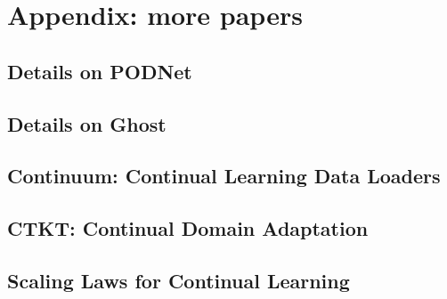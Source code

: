 \chapter{Appendix: more papers}
\label{chapter:appendix}

{}


\section{Details on PODNet}
\label{sec:appendix_podnet}

\section{Details on Ghost}
\label{sec:appendix_ghost}

\section{Continuum: Continual Learning Data Loaders}

\section{CTKT: Continual Domain Adaptation}

\section{Scaling Laws for Continual Learning}


